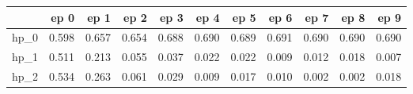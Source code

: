 \begin{tabular}{lrrrrrrrrrr}
\toprule
{} &   ep 0 &   ep 1 &   ep 2 &   ep 3 &   ep 4 &   ep 5 &   ep 6 &   ep 7 &   ep 8 &   ep 9 \\
\midrule
hp\_0 &  0.598 &  0.657 &  0.654 &  0.688 &  0.690 &  0.689 &  0.691 &  0.690 &  0.690 &  0.690 \\
hp\_1 &  0.511 &  0.213 &  0.055 &  0.037 &  0.022 &  0.022 &  0.009 &  0.012 &  0.018 &  0.007 \\
hp\_2 &  0.534 &  0.263 &  0.061 &  0.029 &  0.009 &  0.017 &  0.010 &  0.002 &  0.002 &  0.018 \\
\bottomrule
\end{tabular}
